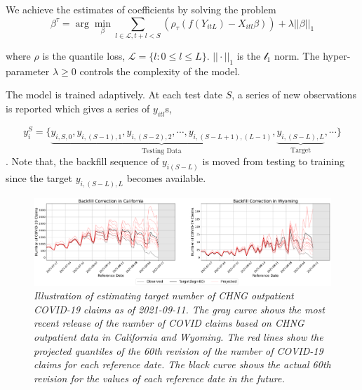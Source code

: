 We achieve the estimates of coefficients by solving the problem
$$ \beta^{\tau} = \arg\min_{\beta} \sum_{l\in \mathcal{L}, t+l < S}(\rho_\tau (f(Y_{itL}) - X_{itl}\beta)) + \lambda ||\beta||_1$$

where $\rho$ is the quantile loss\cite{Koenker1978}, $\mathcal{L} = \{l: 0 \leq l \leq L\}$. $||\cdot||_1$ is the $\mathcal{l}_1$ norm. The hyper-parameter $\lambda \geq 0$ controls the complexity of the model. 


The model is trained adaptively. At each test date $S$, a series of new observations is reported which gives a series of $y_{itl}$s,

$$y_{i}^S = \{\underbrace{y_{i,S,0}, y_{i, (S-1), 1}, y_{i, (S-2), 2}, \cdots, y_{i, (S -L +1),(L-1)}}_\text{Testing Data}, \underbrace{y_{i, (S-L), L}}_\text{Target},  \cdots \}$$.
Note that, the backfill sequence of $y_{i(S-L)}$ is moved from testing to training since the target $y_{i,(S-L), L}$ becomes available. 

\begin{figure}
    \centering
    \includegraphics[width=\textwidth]{figs/count_pred_example_ca&wy.pdf}
    \caption{\textit{Illustration of estimating target number of CHNG outpatient COVID-19 claims as of 2021-09-11. The gray curve shows the most recent release of the number of COVID claims based on CHNG outpatient data in California and Wyoming. The red lines show the projected quantiles of the 60th revision of the number of COVID-19 claims for each reference date. The black curve shows the actual 60th revision for the values of each reference date in the future.}}
\end{figure}

